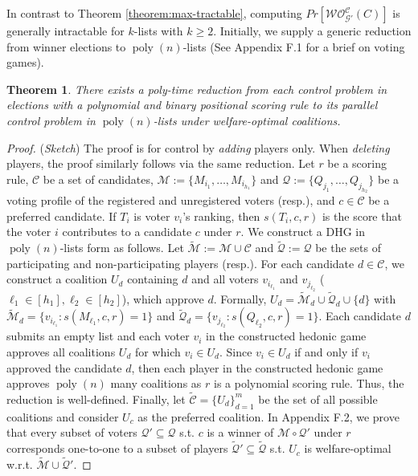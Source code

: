 \documentclass[letterpaper]{article}
\newtheorem{theorem}{Theorem}
\DeclareMathOperator*{\poly}{poly}
\begin{document}
In contrast to Theorem \ref{theorem:max-tractable}, computing $Pr[\mathcal{WO}^{\mathcal{C}}_{\mathcal{G}'}(C)]$ is generally intractable for $k$-lists with $k \geq 2$. Initially, we supply a generic reduction from winner elections to $\poly(n)$-lists (See Appendix F.1 for a brief on voting games).
\begin{theorem}
\label{theorem:reduction}
There exists a poly-time reduction from each control problem in elections with a polynomial and binary positional scoring rule to its parallel control problem in $\poly(n)$-lists under welfare-optimal coalitions.
\end{theorem}
\begin{proof}
(\textit{Sketch})
The proof is for control by \textit{adding} players only. When \textit{deleting} players, the proof similarly follows via the same reduction. Let $r$ be a scoring rule, $\mathcal{C}$ be a set of candidates, $\mathcal{M} := \{M_{i_1}, \dots, M_{i_{h_1}}\}$ and $\mathcal{Q} := \{Q_{j_1}, \dots, Q_{j_{h_2}}\}$ be a voting profile of the registered and unregistered voters (resp.), and $c \in \mathcal{C}$ be a preferred candidate. If $T_i$ is voter $v_i$'s ranking, then $s(T_i, c, r)$ is the score that the voter $i$ contributes to a candidate $c$ under $r$. We construct a DHG in $\poly(n)$-lists form as follows. Let $\tilde{\mathcal{M}} := \mathcal{M} \cup \mathcal{C}$ and $\tilde{\mathcal{Q}} := \mathcal{Q}$ be the sets of participating and non-participating players (resp.). For each candidate $d \in \mathcal{C}$, we construct a coalition $U_d$ containing $d$ and all voters $v_{i_{\ell_1}}$ and $v_{j_{\ell_2}}$ ($\ell_1 \in [h_1], \ell_2 \in [h_2]$), which approve $d$. Formally, $U_d = \tilde{\mathcal{M}}_d \cup \tilde{\mathcal{Q}}_d \cup \{d\}$ with $\tilde{\mathcal{M}}_d = \{v_{i_{\ell_1}} : s(M_{\ell_1}, c, r) = 1 \}$ and $\tilde{\mathcal{Q}}_d = \{v_{j_{\ell_2}} : s(Q_{\ell_2}, c, r) = 1\}$. Each candidate $d$ submits an empty list and each voter $v_i$ in the constructed hedonic game approves all coalitions $U_d$ for which $v_i \in U_d$. Since $v_i \in U_d$ if and only if $v_i$ approved the candidate $d$, then each player in the constructed hedonic game approves $\poly(n)$ many coalitions as $r$ is a polynomial scoring rule. Thus, the reduction is well-defined. Finally, let $\tilde{\mathcal{C}} = \{U_d\}_{d=1}^m$ be the set of all possible coalitions and consider $U_c$ as the preferred coalition. In Appendix F.2, we prove that every subset of voters $\mathcal{Q}' \subseteq \mathcal{Q}$ s.t. $c$ is a winner of $\mathcal{M} \circ \mathcal{Q}'$ under $r$ corresponds one-to-one to a subset of players $\tilde{\mathcal{Q}}' \subseteq \tilde{\mathcal{Q}}$ s.t. $U_c$ is welfare-optimal w.r.t. $\tilde{\mathcal{M}} \cup \tilde{\mathcal{Q}}'$.
\end{proof}
\end{document}

